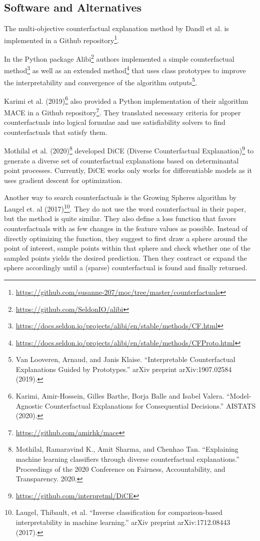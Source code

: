 \documentclass[12pt,]{krantz}
\renewcommand{\href}[2]{#2\footnote{\url{#1}}}
\begin{document}
\subsection{Software and Alternatives}\label{example-software}

The multi-objective counterfactual explanation method by Dandl et al. is
implemented in a
\href{https://github.com/susanne-207/moc/tree/master/counterfactuals}{Github
repository}.

In the Python package \href{https://github.com/SeldonIO/alibi}{Alibi}
authors implemented a
\href{https://docs.seldon.io/projects/alibi/en/stable/methods/CF.html}{simple
counterfactual method} as well as an
\href{https://docs.seldon.io/projects/alibi/en/stable/methods/CFProto.html}{extended
method} that uses class prototypes to improve the interpretability and
convergence of the algorithm outputs\footnote{Van Looveren, Arnaud, and
  Janis Klaise. ``Interpretable Counterfactual Explanations Guided by
  Prototypes.'' arXiv preprint arXiv:1907.02584 (2019).}.

Karimi et al. (2019)\footnote{Karimi, Amir-Hossein, Gilles Barthe, Borja
  Balle and Isabel Valera. ``Model-Agnostic Counterfactual Explanations
  for Consequential Decisions.'' AISTATS (2020).} also provided a Python
implementation of their algorithm MACE in a
\href{https://github.com/amirhk/mace}{Github repository}. They
translated necessary criteria for proper counterfactuals into logical
formulae and use satisfiability solvers to find counterfactuals that
satisfy them.

Mothilal et al. (2020)\footnote{Mothilal, Ramaravind K., Amit Sharma,
  and Chenhao Tan. ``Explaining machine learning classifiers through
  diverse counterfactual explanations.'' Proceedings of the 2020
  Conference on Fairness, Accountability, and Transparency. 2020.}
developed \href{https://github.com/interpretml/DiCE}{DiCE (Diverse
Counterfactual Explanation)} to generate a diverse set of counterfactual
explanations based on determinantal point processes. Currently, DiCE
works only works for differentiable models as it uses gradient descent
for optimization.

Another way to search counterfactuals is the Growing Spheres algorithm
by Laugel et. al (2017)\footnote{Laugel, Thibault, et al. ``Inverse
  classification for comparison-based interpretability in machine
  learning.'' arXiv preprint arXiv:1712.08443 (2017).}. They do not use
the word counterfactual in their paper, but the method is quite similar.
They also define a loss function that favors counterfactuals with as few
changes in the feature values as possible. Instead of directly
optimizing the function, they suggest to first draw a sphere around the
point of interest, sample points within that sphere and check whether
one of the sampled points yields the desired prediction. Then they
contract or expand the sphere accordingly until a (sparse)
counterfactual is found and finally returned.
\end{document}
